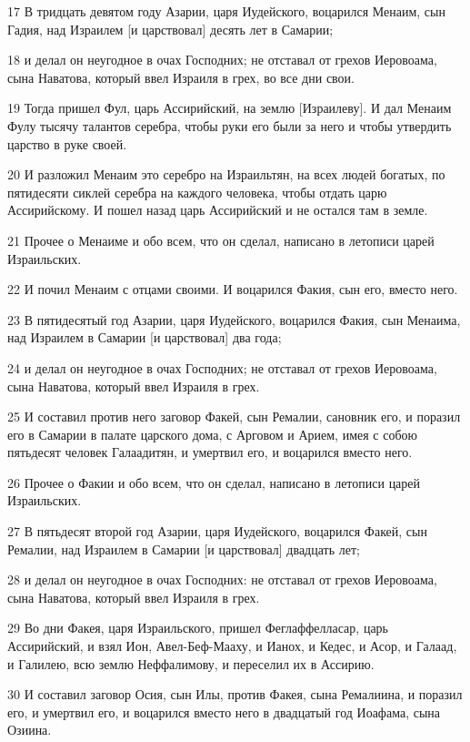 \par 17 В тридцать девятом году Азарии, царя Иудейского, воцарился Менаим, сын Гадия, над Израилем [и царствовал] десять лет в Самарии;
\par 18 и делал он неугодное в очах Господних; не отставал от грехов Иеровоама, сына Наватова, который ввел Израиля в грех, во все дни свои.
\par 19 Тогда пришел Фул, царь Ассирийский, на землю [Израилеву]. И дал Менаим Фулу тысячу талантов серебра, чтобы руки его были за него и чтобы утвердить царство в руке своей.
\par 20 И разложил Менаим это серебро на Израильтян, на всех людей богатых, по пятидесяти сиклей серебра на каждого человека, чтобы отдать царю Ассирийскому. И пошел назад царь Ассирийский и не остался там в земле.
\par 21 Прочее о Менаиме и обо всем, что он сделал, написано в летописи царей Израильских.
\par 22 И почил Менаим с отцами своими. И воцарился Факия, сын его, вместо него.
\par 23 В пятидесятый год Азарии, царя Иудейского, воцарился Факия, сын Менаима, над Израилем в Самарии [и царствовал] два года;
\par 24 и делал он неугодное в очах Господних; не отставал от грехов Иеровоама, сына Наватова, который ввел Израиля в грех.
\par 25 И составил против него заговор Факей, сын Ремалии, сановник его, и поразил его в Самарии в палате царского дома, с Арговом и Арием, имея с собою пятьдесят человек Галаадитян, и умертвил его, и воцарился вместо него.
\par 26 Прочее о Факии и обо всем, что он сделал, написано в летописи царей Израильских.
\par 27 В пятьдесят второй год Азарии, царя Иудейского, воцарился Факей, сын Ремалии, над Израилем в Самарии [и царствовал] двадцать лет;
\par 28 и делал он неугодное в очах Господних: не отставал от грехов Иеровоама, сына Наватова, который ввел Израиля в грех.
\par 29 Во дни Факея, царя Израильского, пришел Феглаффелласар, царь Ассирийский, и взял Ион, Авел-Беф-Мааху, и Ианох, и Кедес, и Асор, и Галаад, и Галилею, всю землю Неффалимову, и переселил их в Ассирию.
\par 30 И составил заговор Осия, сын Илы, против Факея, сына Ремалиина, и поразил его, и умертвил его, и воцарился вместо него в двадцатый год Иоафама, сына Озиина.
